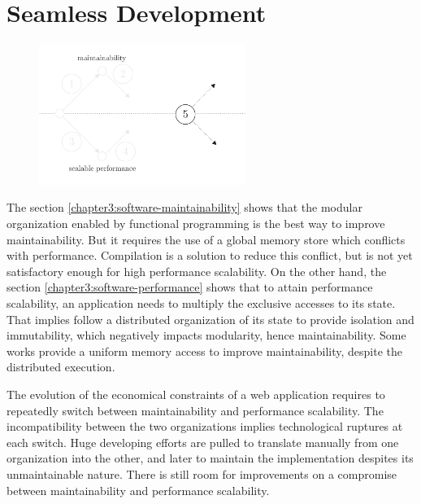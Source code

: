 \section{Seamless Development} \label{chapter3:objectives}

\begin{figure}[h!] \label{fig:state-of-the-art-proposition}
\begin{center}
\includegraphics[width=0.6\textwidth]{../ressources/state-of-the-art-5.pdf}
\end{center}
\end{figure}



The section \ref{chapter3:software-maintainability} shows that the modular organization enabled by functional programming is the best way to improve maintainability.
But it requires the use of a global memory store which conflicts with performance.
Compilation is a solution to reduce this conflict, but is not yet satisfactory enough for high performance scalability.
On the other hand, the section \ref{chapter3:software-performance} shows that to attain performance scalability, an application needs to multiply the exclusive accesses to its state.
That implies follow a distributed organization of its state to provide isolation and immutability, which negatively impacts modularity, hence maintainability.
Some works provide a uniform memory access to improve maintainability, despite the distributed execution.

The evolution of the economical constraints of a web application requires to repeatedly switch between maintainability and performance scalability.
The incompatibility between the two organizations implies technological ruptures at each switch.
Huge developing efforts are pulled to translate manually from one organization into the other, and later to maintain the implementation despites its unmaintainable nature.
There is still room for improvements on a compromise between maintainability and performance scalability.

